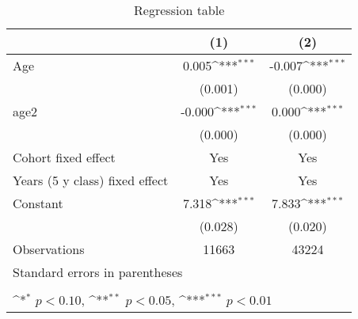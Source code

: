 \begin{table}[htbp]\centering
    \def\sym#1{\ifmmode^{#1}\else\(^{#1}\)\fi}
    \caption{Regression table \label{reg3}}
    \begin{tabular}{l*{2}{c}}
    \hline
                        &\multicolumn{1}{c}{(1)}         &\multicolumn{1}{c}{(2)}         \\
    \hline
    Age                 &       0.005\sym{***}&      -0.007\sym{***}\\
                        &     (0.001)         &     (0.000)         \\
    age2                &      -0.000\sym{***}&       0.000\sym{***}\\
                        &     (0.000)         &     (0.000)         \\
    \hline
    Cohort fixed effect           &       Yes        &       Yes        \\
    Years (5 y class) fixed effect             &       Yes       &       Yes         \\
    Constant            &       7.318\sym{***}&       7.833\sym{***}\\
                        &     (0.028)         &     (0.020)         \\
    \hline
    Observations        &       11663         &       43224         \\
    \hline
    \multicolumn{3}{l}{\footnotesize Standard errors in parentheses}\\
    \multicolumn{3}{l}{\footnotesize }\\
    \multicolumn{3}{l}{\footnotesize \sym{*} \(p<0.10\), \sym{**} \(p<0.05\), \sym{***} \(p<0.01\)}\\
    \end{tabular}
    \end{table}
    